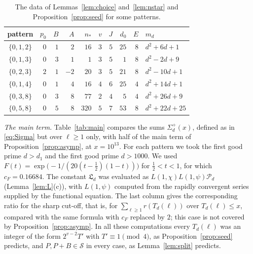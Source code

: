 \documentclass[11pt]{amsart}
\theoremstyle{remark}
\theoremstyle{definition}
\numberwithin{equation}{section}
\newcommand{\Sc}{\mathcal{S}}
\newcommand{\Lf}{\mathfrak{L}}
\begin{document}
\begin{table}[h]
\centering
\begin{tabular}{crrrrrrrrl}
\toprule
pattern & $p_0$ & $B$ & $A$ & $n_*$ & $v$ & $J$ & $d_0$ & $E$ & $m_d$\\
\midrule
$\{0,1,2\}$ & $0$ & $1$ & $2$ & $16$ & $3$ & $5$ & $25$ & $8$ & $d^2+6d+1$\\
$\{0,1,3\}$ & $0$ & $3$ & $1$ & $1$ & $3$ & $5$ & $1$ & $8$ & $d^2-2d+9$\\
$\{0,2,3\}$ & $2$ & $1$ & $-2$ & $20$ & $3$ & $5$ & $21$ & $8$ & $d^2-10d+1$\\
$\{0,1,4\}$ & $0$ & $1$ & $4$ & $16$ & $4$ & $6$ & $25$ & $4$ & $d^2+14d+1$\\
$\{0,3,8\}$ & $0$ & $3$ & $8$ & $77$ & $2$ & $4$ & $5$ & $4$ & $d^2+26d+9$\\
$\{0,5,8\}$ & $0$ & $5$ & $8$ & $320$ & $5$ & $7$ & $53$ & $8$ & $d^2+22d+25$\\
\bottomrule
\end{tabular}
\caption{The data of Lemmas~\ref{lem:choice} and~\ref{lem:nstar} and Proposition~\ref{prop:seed} for some patterns.}
\label{tab:seeds}
\end{table}

\emph{The main term.} Table~\ref{tab:main} compares the sums $\Sigma_d^+(x)$, defined as in \eqref{eq:Sigma} but over $\ell\ge1$ only, with half of the main term of Proposition~\ref{prop:asymp}, at $x=10^{13}$. For each pattern we took the first good prime $d>d_1$ and the first good prime $d>1000$. We used $F(t)=\exp\bigl(-1/(20(t-\frac12)(1-t))\bigr)$ for $\frac12<t<1$, for which $c_F=0.16684$. The constant $\Lf_d$ was evaluated as $L(1,\chi)L(1,\psi)\mathcal P_d$ (Lemma~\ref{lem:L}(c)), with $L(1,\psi)$ computed from the rapidly convergent series supplied by the functional equation. The last column gives the corresponding ratio for the sharp cut-off, that is, for $\sum_{\ell\ge1}r(T_d(\ell))$ over $T_d(\ell)\le x$, compared with the same formula with $c_F$ replaced by $2$; this case is not covered by Proposition~\ref{prop:asymp}. In all these computations every $T_d(\ell)$ was an integer of the form $2^{v-2}T'$ with $T'\equiv1\pmod 4$, as Proposition~\ref{prop:seed} predicts, and $P,P+B\in\Sc$ in every case, as Lemma~\ref{lem:split} predicts.
\end{document}
